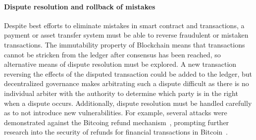 
\paragraph{Dispute resolution and rollback of mistakes}
Despite best efforts to eliminate mistakes in smart contract and transactions, a payment or asset transfer system must be able to reverse fraudulent or mistaken transactions. The immutability property of Blockchain means that transactions cannot be stricken from the ledger after consensus has been reached, so alternative means of dispute resolution must be explored. A new transaction reversing the effects of the disputed transaction could be added to the ledger, but decentralized governance makes arbitrating such a dispute difficult as there is no individual arbiter with the authority to determine which party is in the right when a dispute occurs.  Additionally, dispute resolution must be handled carefully as to not introduce new vulnerabilities.  For example, several attacks were demonstrated against the Bitcoing refund mechanism~\cite{FC:MccShaHao16}, prompting further research into the security of refunds for financial transactions in Bitcoin~\cite{arxiv:AviSafSha18}.

